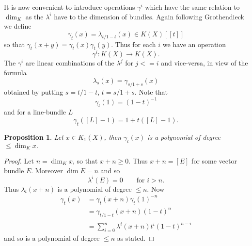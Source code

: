 \documentclass[leqno]{book}
\numberwithin{equation}{section}
\newtheorem{proposition}[theorem]{Proposition}
\theoremstyle{definition}
\begin{document}
            It is now convenient to introduce operations $\gamma^{i}$ which have the same relation to $\operatorname{dim}_{K}$ as the $\lambda^{i}$ have to the dimension of bundles. Again following Grothendieck we define
            \begin{equation*}
              \gamma_{t}(x)=\lambda_{t/1-t}(x) \in K(X)[[t]]
            \end{equation*}
            so that $\gamma_{t}(x+y)=\gamma_{t}(x)\gamma_{t}(y)$. Thus for each $i$ we have an operation
            \begin{equation*}
              \gamma^{i}:K(X)\to K(X).
            \end{equation*}
            The $\gamma^{i}$ are linear combinations of the $\lambda^{j}$ for $j<=i$ and vice-versa, in view of the formula
            \begin{equation*}
              \lambda_{s}(x)=\gamma_{s/1+s}(x)
            \end{equation*}
            obtained by putting $s=t/1-t$, $t=s/1+s$. Note that
            \begin{equation*}
              \gamma_{t}(1)=(1-t)^{-1}
            \end{equation*}
            and for a line-bundle $L$
            \begin{equation*}
              \gamma_{t}([L]-1)=1+t([L]-1).
            \end{equation*}

            \begin{proposition}
              Let $x\in K_{1}(X)$, then $\gamma_{t}(x)$ is a polynomial of degree $\le \operatorname{dim}_{K}x.$
            \end{proposition}

            \begin{proof}
              Let $n=\operatorname{dim}_{K}x$, so that $x+n\ge 0$. Thus $x+n=[E]$ for some vector bundle $E$. Moreover $\operatorname{dim}E=n$ and so
              \begin{equation*}
                \lambda^{i}(E)=0\qquad \text{for } i>n.
              \end{equation*}
              Thus $\lambda_{t}(x+n)$ is a polynomial of degree $\le n$. Now
              \begin{equation*}
                \begin{aligned}
                  \gamma_{t}(x)&=\gamma_{t}(x+n)\gamma_{t}(1)^{-n} \\
                  &= \gamma_{t/1-t}(x+n)(1-t)^{n} \\
                  &= \sum_{i=0}^{n} \lambda^{i}(x+n)t ^{i}(1-t)^{n-i}
                \end{aligned}
              \end{equation*}
              and so is a polynomial of degree $\le n$ as stated.
            \end{proof}
\end{document}
